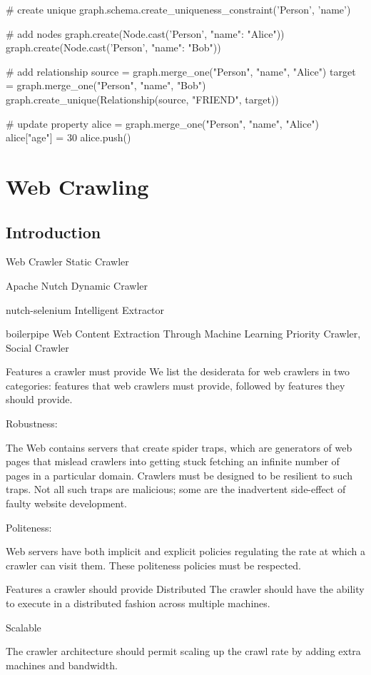 {# create unique
graph.schema.create_uniqueness_constraint('Person', 'name')

# add nodes
graph.create(Node.cast('Person', {"name": "Alice"}))
graph.create(Node.cast('Person', {"name": "Bob"}))

# add relationship
source = graph.merge_one("Person", "name", "Alice")
target = graph.merge_one("Person", "name", "Bob")
graph.create_unique(Relationship(source, "FRIEND", target))

# update property
alice = graph.merge_one("Person", "name", "Alice")
alice["age"] = 30
alice.push()

\section{Web Crawling}

\subsection{Introduction}

Web Crawler
Static Crawler

Apache Nutch
Dynamic Crawler

nutch-selenium
Intelligent Extractor

boilerpipe
Web Content Extraction Through Machine Learning
Priority Crawler, Social Crawler

Features a crawler must provide
We list the desiderata for web crawlers in two categories: features that web crawlers must provide, followed by features they should provide.

Robustness:

The Web contains servers that create spider traps, which are generators of web pages that mislead crawlers into getting stuck fetching an infinite number of pages in a particular domain. Crawlers must be designed to be resilient to such traps. Not all such traps are malicious; some are the inadvertent side-effect of faulty website development.

Politeness:

Web servers have both implicit and explicit policies regulating the rate at which a crawler can visit them. These politeness policies must be respected.

Features a crawler should provide
Distributed The crawler should have the ability to execute in a distributed fashion across multiple machines.

Scalable

The crawler architecture should permit scaling up the crawl rate by adding extra machines and bandwidth.

}
